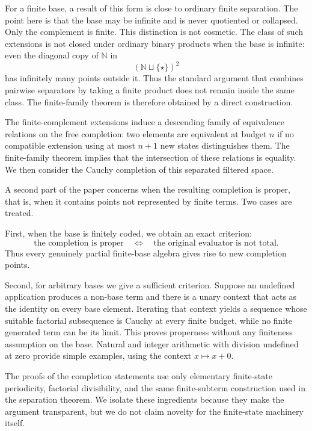 For a finite base, a result of this form is close to ordinary finite
separation.  The point here is that the base may be infinite and is never
quotiented or collapsed.  Only the complement is finite.  This distinction is
not cosmetic.  The class of such extensions is not closed under ordinary
binary products when the base is infinite: even the diagonal copy of
$\mathbb N$ in
\[
 (\mathbb N\sqcup\{\star\})^2
\]
has infinitely many points outside it.  Thus the standard argument that
combines pairwise separators by taking a finite product does not remain inside
the same class.  The finite-family theorem is therefore obtained by a direct
construction.

The finite-complement extensions induce a descending family of equivalence
relations on the free completion: two elements are equivalent at budget $n$ if
no compatible extension using at most $n+1$ new states distinguishes them.  The
finite-family theorem implies that the intersection of these relations is
equality.  We then consider the Cauchy completion of this separated filtered
space.

A second part of the paper concerns when the resulting completion is proper,
that is, when it contains points not represented by finite terms.  Two cases
are treated.

First, when the base is finitely coded, we obtain an exact criterion:
\[
 \text{the completion is proper}
 \quad\Longleftrightarrow\quad
 \text{the original evaluator is not total}.
\]
Thus every genuinely partial finite-base algebra gives rise to new completion
points.

Second, for arbitrary bases we give a sufficient criterion.  Suppose an
undefined application produces a non-base term and there is a unary context
that acts as the identity on every base element.  Iterating that context yields
a sequence whose suitable factorial subsequence is Cauchy at every finite
budget, while no finite generated term can be its limit.  This proves
properness without any finiteness assumption on the base.  Natural and integer
arithmetic with division undefined at zero provide simple examples, using the
context $x\mapsto x+0$.

The proofs of the completion statements use only elementary finite-state
periodicity, factorial divisibility, and the same finite-subterm construction
used in the separation theorem.  We isolate these ingredients because they make
the argument transparent, but we do not claim novelty for the finite-state
machinery itself.

